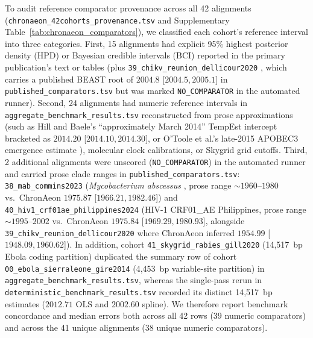 \documentclass[11pt,letterpaper]{article}
\begin{document}
To audit reference comparator provenance across all 42 alignments (\texttt{chronaeon\_42cohorts\_provenance.tsv} and Supplementary Table~\ref{tab:chronaeon_comparators}), we classified each cohort's reference interval into three categories. First, 15 alignments had explicit 95\% highest posterior density (HPD) or Bayesian credible intervals (BCI) reported in the primary publication's text or tables (plus \texttt{39\_chikv\_reunion\_dellicour2020} \cite{dellicour2020chikv}, which carries a published BEAST root of $2004.8$ [$2004.5, 2005.1$] in \texttt{published\_comparators.tsv} but was marked \texttt{NO\_COMPARATOR} in the automated runner). Second, 24 alignments had numeric reference intervals in \texttt{aggregate\_benchmark\_results.tsv} reconstructed from prose approximations (such as Hill and Baele's ``approximately March 2014'' TempEst intercept \cite{hill2019skygrid} bracketed as $2014.20$ [$2014.10, 2014.30$], or O'Toole et al.'s late-2015 APOBEC3 emergence estimate \cite{otoole2023mpox}), molecular clock calibrations, or Skygrid grid cutoffs. Third, 2 additional alignments were unscored (\texttt{NO\_COMPARATOR}) in the automated runner and carried prose clade ranges in \texttt{published\_comparators.tsv}: \texttt{38\_mab\_commins2023} (\textit{Mycobacterium abscessus} \cite{commins2023mab}, prose range $\sim 1960\text{--}1980$ vs.\ ChronAeon $1975.87$ [$1966.21, 1982.46$]) and \texttt{40\_hiv1\_crf01ae\_philippines2024} (HIV-1 CRF01\_AE Philippines, prose range $\sim 1995\text{--}2002$ vs.\ ChronAeon $1975.84$ [$1969.29, 1980.93$], alongside \texttt{39\_chikv\_reunion\_dellicour2020} where ChronAeon inferred $1954.99$ [$1948.09, 1960.62$]). In addition, cohort \texttt{41\_skygrid\_rabies\_gill2020} (14,517~bp Ebola coding partition) duplicated the summary row of cohort \texttt{00\_ebola\_sierraleone\_gire2014} (4,453~bp variable-site partition) in \texttt{aggregate\_benchmark\_results.tsv}, whereas the single-pass rerun in \texttt{deterministic\_benchmark\_results.tsv} recorded its distinct 14,517~bp estimates ($2012.71$ OLS and $2002.60$ spline). We therefore report benchmark concordance and median errors both across all 42 rows (39 numeric comparators) and across the 41 unique alignments (38 unique numeric comparators).
\end{document}
